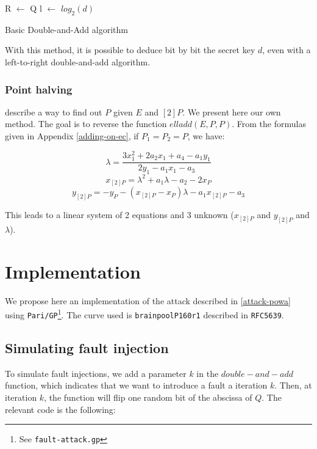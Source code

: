 \documentclass[journal]{IEEEtran}
\begin{document}
\begin{algorithm}
    \SetAlgoLined %
   
    \SetSideCommentLeft 
    \SetNoFillComment

    
    
    R $\leftarrow$ Q\;
    l $\leftarrow$ $log_2(d)$\;

    \bigskip

    \caption{Basic Double-and-Add algorithm}
    \label{rev-d-and-a-algo}

\end{algorithm}

With this method, it is possible to deduce bit by bit the secret key $d$, even with a left-to-right double-and-add algorithm.

\subsubsection{Point halving}
\cite{rodriguezelliptic} describe a way to find out $P$ given $E$ and $[2]P$. We present here our own method.
The goal is to reverse the function $elladd(E, P, P)$. From the formulas given in Appendix \ref{adding-on-ec}, if $P_1 = P_2 = P$, we have:

$$ \lambda = \frac{3 x_1^2 + 2 a_2 x_1 + a_4 - a_1 y_1}{2 y_1 - a_1 x_1 - a_3} $$
$$ x_{[2]P} = \lambda^2 + a_1 \lambda - a_2 - 2 x_P $$
$$ y_{[2]P} = -y_P - (x_{[2]P} - x_P) \lambda - a_1 x_{[2]P} - a_3 $$

This leads to a linear system of 2 equations and 3 unknown ($x_{[2]P}$ and $y_{[2]P}$ and $\lambda$).

\section{Implementation}
We propose here an implementation of the attack described in \ref{attack-powa} using {\tt Pari/GP}\footnote{See {\tt fault-attack.gp}}. The curve used is {\tt brainpoolP160r1} described in {\tt RFC5639}.

\subsection{Simulating fault injection}
To simulate fault injections, we add a parameter $k$ in the $double-and-add$ function, which indicates that we want to introduce a fault a iteration $k$. Then, at iteration $k$, the function will flip one random bit of
the abscissa of $Q$. The relevant code is the following: 
\end{document}
